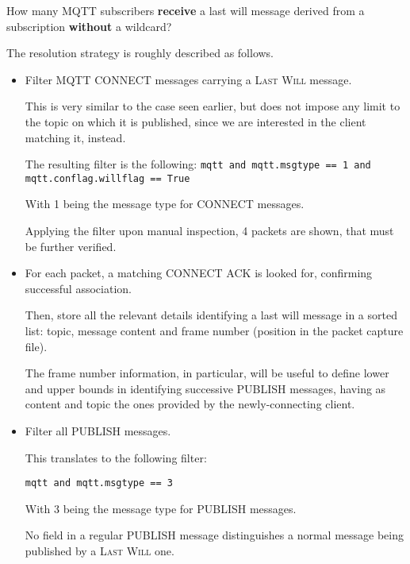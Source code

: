 \documentclass[a4paper,11pt]{article} %
\begin{document}
    How many MQTT subscribers \textbf{receive} a last will message derived from a subscription \textbf{without} a wildcard?

    \medskip

    The resolution strategy is roughly described as follows.

    \begin{itemize}
        \item Filter \textsc{MQTT CONNECT} messages carrying a \textsc{Last Will} message.

        This is very similar to the case seen earlier, but does not impose any limit to the topic on which it is published, since we are interested in the client matching it, instead.

        The resulting filter is the following:
        \texttt{mqtt and mqtt.msgtype == 1 and mqtt.conflag.willflag == True}

        With 1 being the message type for \textsc{CONNECT} messages.

        Applying the filter upon manual inspection, 4 packets are shown, that must be further verified.
        \item For each packet, a matching \textsc{CONNECT ACK} is looked for, confirming successful association.

        Then, store all the relevant details identifying a last will message in a sorted list: topic, message content and frame number (position in the packet capture file).

        The frame number information, in particular, will be useful to define lower and upper bounds in identifying successive \textsc{PUBLISH} messages, having as content and topic the ones provided by the newly-connecting client.
        \item Filter all \textsc{PUBLISH} messages.

        This translates to the following filter:

        \texttt{mqtt and mqtt.msgtype == 3}

        With 3 being the message type for \textsc{PUBLISH} messages.

        No field in a regular \textsc{PUBLISH} message distinguishes a normal message being published by a \textsc{Last Will} one.


\end{itemize}
\end{document}
